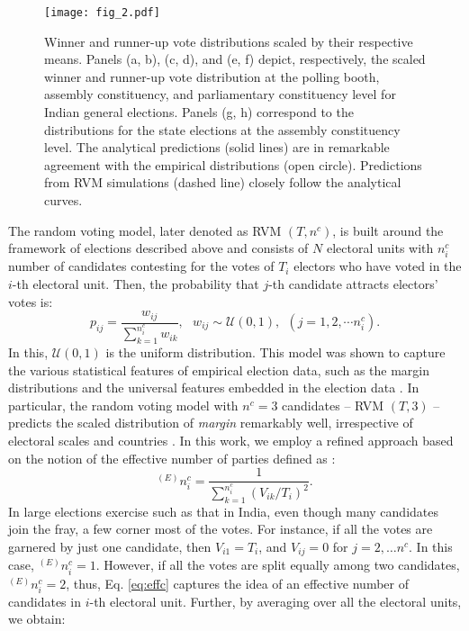 \begin{figure*}[t]
    \centering
    \texttt{[image: fig\_2.pdf]}
    \caption{Winner and runner-up vote distributions scaled by their respective means. Panels (a, b), (c, d), and (e, f) depict, respectively, the scaled winner and runner-up vote distribution at the polling booth, assembly constituency, and parliamentary constituency level for Indian general elections. Panels (g, h) correspond to the distributions for the state elections at the assembly constituency level. The analytical predictions (solid lines) are in remarkable agreement with the empirical distributions (open circle). Predictions from RVM simulations (dashed line) closely follow the analytical curves.}
    \label{fig:2}
\end{figure*}

The random voting model, later denoted as {RVM $(T, n^c)$}, is built around the framework of elections described above and consists of $N$ electoral units with $n^c_i$ number of candidates contesting for the votes of $T_i$ electors who have voted in the $i$-th electoral unit. Then, the probability that $j$-th candidate attracts electors' votes is:
\begin{equation}
    p_{ij} = \frac{w_{ij}}{\sum_{k=1}^{n^c_i} w_{ik}}, ~~~w_{ij} \sim \mathcal{U}(0, 1), ~~ (j = 1, 2, \cdots n^c_i).
    \label{eq:prob}
\end{equation}
In this, $\mathcal{U}(0, 1)$ is the uniform distribution. This model was shown to capture the various statistical features of empirical election data, such as the margin distributions and the universal features embedded in the election data \cite{pal2024universal}. In particular, the random voting model with $n^c = 3$ candidates -- {RVM $(T, 3)$} -- predicts the scaled distribution of \emph{margin} remarkably well, irrespective of electoral scales and countries \cite{pal2024universal}. In this work, we employ a refined approach based on the notion of the effective number of parties defined as \cite{laakso1979effective}:
\begin{equation}
    ^{(E)}n^c_i = \frac{1}{\sum_{k=1}^{n^c_i} (V_{ik} / T_{i})^2}.
    \label{eq:effc}
\end{equation}
In large elections exercise such as that in India, even though many candidates join the fray, a few corner most of the votes. For instance, if all the votes are garnered by just one candidate, then $V_{i1}=T_i$, and $V_{ij}=0$ for $j=2, \dots n^c$. In this case, $^{(E)}n^c_i=1$. However, if all the votes are split equally among two candidates, $^{(E)}n^c_i=2$, thus, Eq. \ref{eq:effc} captures the idea of an effective number of candidates in $i$-th electoral unit. Further, by averaging over all the electoral units, we obtain: 
